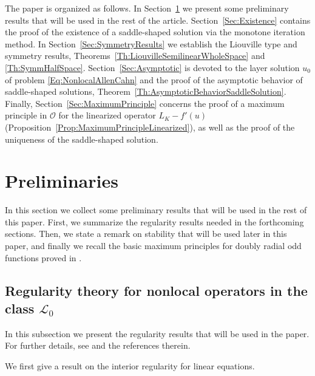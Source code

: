 \documentclass[12pt,reqno]{amsart}
\theoremstyle{definition}
\theoremstyle{remark}
\newcommand{\lcal}{\mathcal{L}}
\newcommand{\ocal}{\mathcal{O}}
\numberwithin{equation}{section}
\begin{document}
The paper is organized as follows. In Section~\ref{Sec:Preliminaries} we present some preliminary results that will be used in the rest of the article. Section~\ref{Sec:Existence} contains the proof of the existence of a saddle-shaped solution via the monotone iteration method. In Section~\ref{Sec:SymmetryResults} we establish the Liouville type and symmetry results, Theorems~\ref{Th:LiouvilleSemilinearWholeSpace} and \ref{Th:SymmHalfSpace}. Section~\ref{Sec:Asymptotic} is devoted to the layer solution $u_0$ of problem \eqref{Eq:NonlocalAllenCahn} and the proof of the asymptotic behavior of saddle-shaped solutions, Theorem~\ref{Th:AsymptoticBehaviorSaddleSolution}. Finally, Section~\ref{Sec:MaximumPrinciple} concerns the proof of a maximum principle in $\ocal$ for the linearized operator $L_K - f'(u)$ (Proposition~\ref{Prop:MaximumPrincipleLinearized}), as well as the proof of the uniqueness of the saddle-shaped solution.

\section{Preliminaries}
\label{Sec:Preliminaries}

In this section we collect some preliminary results that will be used in the rest of this paper. First, we summarize the regularity results needed in the forthcoming sections. Then, we state a remark on stability that will be used later in this paper, and finally we recall the basic maximum principles for doubly radial odd functions proved in \cite{FelipeSanz-Perela:IntegroDifferentialI}.



\subsection{Regularity theory for nonlocal operators in the class $\lcal_0$}
\label{Subsec:Regularity}


In this subsection we present the regularity results that will be used in the paper. For further details, see \cite{RosOton-Survey,SerraC2s+alphaRegularity} and the references therein. 


We first give a result on the interior regularity for linear equations.
\end{document}

